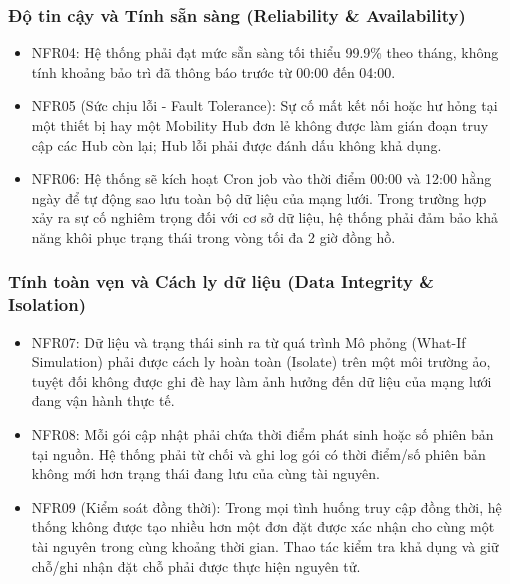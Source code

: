 \subsubsection{Độ tin cậy và Tính sẵn sàng (Reliability \& Availability)}

\begin{itemize}

\item NFR04: Hệ thống phải đạt mức sẵn sàng tối thiểu 99.9\% theo tháng, không tính khoảng bảo trì đã thông báo trước từ 00:00 đến 04:00.

\item NFR05 (Sức chịu lỗi - Fault Tolerance): Sự cố mất kết nối hoặc hư hỏng tại một thiết bị hay một Mobility Hub đơn lẻ không được làm gián đoạn truy cập các Hub còn lại; Hub lỗi phải được đánh dấu không khả dụng.

\item NFR06: Hệ thống sẽ kích hoạt Cron job vào thời điểm 00:00 và 12:00 hằng ngày để tự động sao lưu toàn bộ dữ liệu của mạng lưới. Trong trường hợp xảy ra sự cố nghiêm trọng đối với cơ sở dữ liệu, hệ thống phải đảm bảo khả năng khôi phục trạng thái trong vòng tối đa 2 giờ đồng hồ.

\end{itemize}

\subsubsection{Tính toàn vẹn và Cách ly dữ liệu (Data Integrity \& Isolation)}

\begin{itemize}

\item NFR07: Dữ liệu và trạng thái sinh ra từ quá trình Mô phỏng (What-If Simulation) phải được cách ly hoàn toàn (Isolate) trên một môi trường ảo, tuyệt đối không được ghi đè hay làm ảnh hưởng đến dữ liệu của mạng lưới đang vận hành thực tế.

\item NFR08: Mỗi gói cập nhật phải chứa thời điểm phát sinh hoặc số phiên bản tại nguồn. Hệ thống phải từ chối và ghi log gói có thời điểm/số phiên bản không mới hơn trạng thái đang lưu của cùng tài nguyên.

\item NFR09 (Kiểm soát đồng thời): Trong mọi tình huống truy cập đồng thời, hệ thống không được tạo nhiều hơn một đơn đặt được xác nhận cho cùng một tài nguyên trong cùng khoảng thời gian. Thao tác kiểm tra khả dụng và giữ chỗ/ghi nhận đặt chỗ phải được thực hiện nguyên tử.

\end{itemize}

